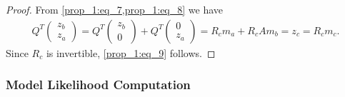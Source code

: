 \documentclass[microtype]{gtpart}     %
\theoremstyle{definition}
\begin{document}
\begin{proof}
	From \cref{prop_1:eq_7,prop_1:eq_8} we have
	\begin{align*}
	Q^T\begin{pmatrix} z_b \\ z_a \end{pmatrix} = 
	Q^T\begin{pmatrix} z_b \\ 0 \end{pmatrix} + Q^T\begin{pmatrix} 0 \\ z_a \end{pmatrix} =
	R_c m_a + R_c A m_b =
	z_c = R_c m_c.
	\end{align*}
	Since $R_c$ is invertible, \cref{prop_1:eq_9} follows.
	
\end{proof}



\subsubsection{Model Likelihood Computation}

%
%
%


%


\end{document}
